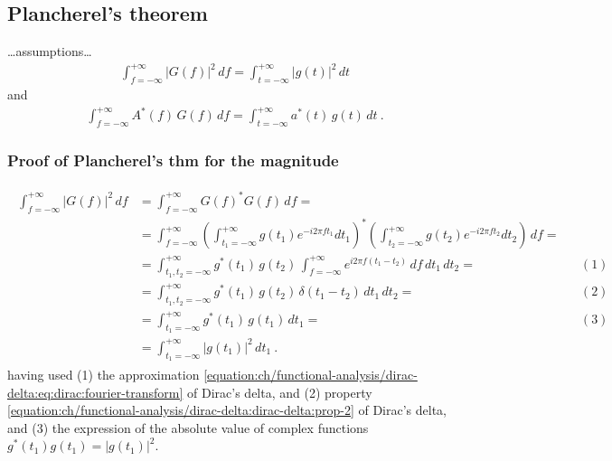 \documentclass[letterpaper,10pt,english]{jupyterBook}
\begin{document}
\subsection{Plancherel’s theorem}
\label{\detokenize{ch/complex/fourier-transform:plancherel-s-theorem}}\label{\detokenize{ch/complex/fourier-transform:complex-fourier-transform-plancherel}}
\sphinxAtStartPar
…assumptions…
\begin{equation}\label{equation:ch/complex/fourier-transform:eq:fourier:transform:plancherel:magnitude}
\begin{split}\int_{f=-\infty}^{+\infty} |G(f)|^2 \, df = \int_{t=-\infty}^{+\infty} |g(t)|^2 \, dt \end{split}
\end{equation}
\sphinxAtStartPar
and
\begin{equation}\label{equation:ch/complex/fourier-transform:eq:fourier:transform:plancherel}
\begin{split}\int_{f=-\infty}^{+\infty} A^*(f) \, G(f)\, df = \int_{t=-\infty}^{+\infty} a^*(t) \, g(t) \, dt \ .\end{split}
\end{equation}\subsubsection*{Proof of Plancherel’s thm for the magnitude}
\begin{equation*}
\begin{split}\begin{aligned}
\int_{f=-\infty}^{+\infty} |G(f)|^2 \, df 
& = \int_{f=-\infty}^{+\infty} G(f)^* G(f) \, df =  \\
& = \int_{f=-\infty}^{+\infty} \left( \int_{t_1=-\infty}^{+\infty} g(t_1) e^{-i 2 \pi f t_1} dt_1 \right)^* \left( \int_{t_2=-\infty}^{+\infty} g(t_2) e^{-i 2 \pi f t_2} dt_2  \right) \, df =  \\
& =  \int_{t_1, t_2=-\infty}^{+\infty} g^*(t_1) \, g(t_2) \, \int_{f=-\infty}^{+\infty} e^{i 2 \pi f ( t_1 - t_2 )} \, df \, dt_1 \, dt_2 =  && (1) \\
& =  \int_{t_1, t_2=-\infty}^{+\infty} g^*(t_1) \, g(t_2) \, \delta( t_1 - t_2 ) \, dt_1 \, dt_2 = && (2) \\
& =  \int_{t_1=-\infty}^{+\infty} g^*(t_1) \, g(t_1) \, dt_1 = && (3) \\
& =  \int_{t_1=-\infty}^{+\infty} |g(t_1)|^2 \, dt_1 \ .
\end{aligned}\end{split}
\end{equation*}
\sphinxAtStartPar
having used (1) the approximation \eqref{equation:ch/functional-analysis/dirac-delta:eq:dirac:fourier-transform} of Dirac’s delta, and (2) property \eqref{equation:ch/functional-analysis/dirac-delta:dirac-delta:prop-2} of Dirac’s delta, and (3) the expression of the absolute value of complex functions \(g^*(t_1) g(t_1) = |g(t_1)|^2\).
\end{document}
